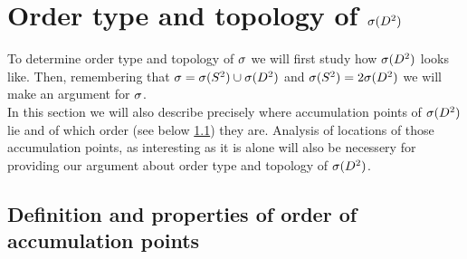 \section{Order type and topology of ${{\sigma}(D^2)}$}
To determine order type and topology of ${\sigma}$ we will first study how ${{\sigma}(D^2)}$ looks like. 
Then, remembering that 
${\sigma} = {{\sigma}(S^2)} \cup {{\sigma}(D^2)}$ and ${{\sigma}(S^2)} = 2{{\sigma}(D^2)}$ we will make an argument for ${\sigma}$. \\
In this section we will also describe precisely where accumulation points of ${{\sigma}(D^2)}$ lie and of 
 which order 
(see below \ref{accumulation_points_definitions}) they are. Analysis of locations of those 
accumulation points, as interesting as it is alone will also be necessery for providing 
our argument about order type and topology of ${{\sigma}(D^2)}$. \\
\subsection{Definition and properties of order of accumulation points}
\label{accumulation_points_definitions} 
